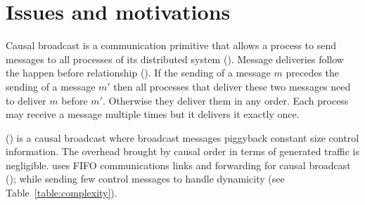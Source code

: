 
\section{Issues and motivations}
\label{sec:motivations}

Causal broadcast is a communication primitive that allows a process to send
messages to all processes of its distributed system (\REF). Message deliveries
follow the happen before relationship (\REF). If the sending of a message $m$
precedes the sending of a message $m'$ then all processes that deliver these two
messages need to deliver $m$ before $m'$. Otherwise they deliver them in any
order. Each process may receive a message multiple times but it delivers it
exactly once.

\PCBROADCAST (\REF) is a causal broadcast where broadcast messages piggyback
constant size control information. The overhead brought by causal order in terms
of generated traffic is negligible.  \PCBROADCAST uses FIFO communications links
and forwarding for causal broadcast (\REF); while sending few control messages
to handle dynamicity (see Table~\ref{table:complexity}).

